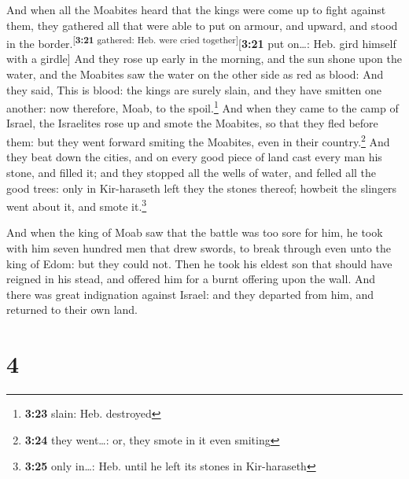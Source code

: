  And when all the Moabites heard that the kings were come
up to fight against them, they gathered all that were able to put on
armour, and upward, and stood in the
border.\textsuperscript{{[}\textbf{3:21} gathered: Heb. were cried
together{]}}{[}\textbf{3:21} put on\ldots: Heb. gird himself with a
girdle{]}  And they rose up early in the morning, and the
sun shone upon the water, and the Moabites saw the water on the other
side as red as blood:  And they said, This is blood: the
kings are surely slain, and they have smitten one another: now
therefore, Moab, to the spoil.\footnote{\textbf{3:23} slain: Heb.
  destroyed}  And when they came to the camp of Israel,
the Israelites rose up and smote the Moabites, so that they fled before
them: but they went forward smiting the Moabites, even in their
country.\footnote{\textbf{3:24} they went\ldots: or, they smote in it
  even smiting}  And they beat down the cities, and on
every good piece of land cast every man his stone, and filled it; and
they stopped all the wells of water, and felled all the good trees: only
in Kir-haraseth left they the stones thereof; howbeit the slingers went
about it, and smote it.\footnote{\textbf{3:25} only in\ldots: Heb. until
  he left its stones in Kir-haraseth}

 And when the king of Moab saw that the battle was too
sore for him, he took with him seven hundred men that drew swords, to
break through even unto the king of Edom: but they could not.
 Then he took his eldest son that should have reigned in
his stead, and offered him for a burnt offering upon the wall. And there
was great indignation against Israel: and they departed from him, and
returned to their own land.

\hypertarget{section-3}{%
\section{4}\label{section-3}}

